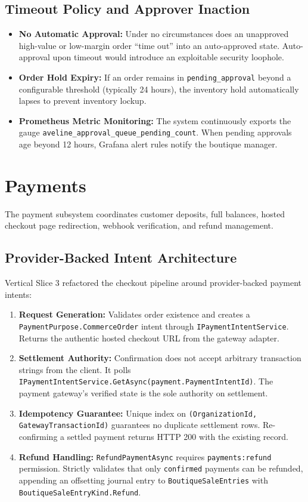 \subsection{Timeout Policy and Approver Inaction}

\begin{itemize}
    \item \textbf{No Automatic Approval:} Under no circumstances does an unapproved high-value or low-margin order ``time out'' into an auto-approved state. Auto-approval upon timeout would introduce an exploitable security loophole.
    \item \textbf{Order Hold Expiry:} If an order remains in \texttt{pending\_approval} beyond a configurable threshold (typically 24 hours), the inventory hold automatically lapses to prevent inventory lockup.
    \item \textbf{Prometheus Metric Monitoring:} The system continuously exports the gauge \texttt{aveline\_approval\_queue\_pending\_count}. When pending approvals age beyond 12 hours, Grafana alert rules notify the boutique manager.
\end{itemize}

\section{Payments}
\label{sec:c-payments}

The payment subsystem coordinates customer deposits, full balances, hosted checkout page redirection, webhook verification, and refund management.

\subsection{Provider-Backed Intent Architecture}

Vertical Slice 3 refactored the checkout pipeline around provider-backed payment intents:
\begin{enumerate}
    \item \textbf{Request Generation:} Validates order existence and creates a \texttt{PaymentPurpose.CommerceOrder} intent through \texttt{IPaymentIntentService}. Returns the authentic hosted checkout URL from the gateway adapter.
    \item \textbf{Settlement Authority:} Confirmation does not accept arbitrary transaction strings from the client. It polls \texttt{IPaymentIntentService.GetAsync(payment.PaymentIntentId)}. The payment gateway's verified state is the sole authority on settlement.
    \item \textbf{Idempotency Guarantee:} Unique index on \texttt{(OrganizationId, GatewayTransactionId)} guarantees no duplicate settlement rows. Re-confirming a settled payment returns HTTP 200 with the existing record.
    \item \textbf{Refund Handling:} \texttt{RefundPaymentAsync} requires \texttt{payments:refund} permission. Strictly validates that only \texttt{confirmed} payments can be refunded, appending an offsetting journal entry to \texttt{BoutiqueSaleEntries} with \texttt{BoutiqueSaleEntryKind.Refund}.
\end{enumerate}

